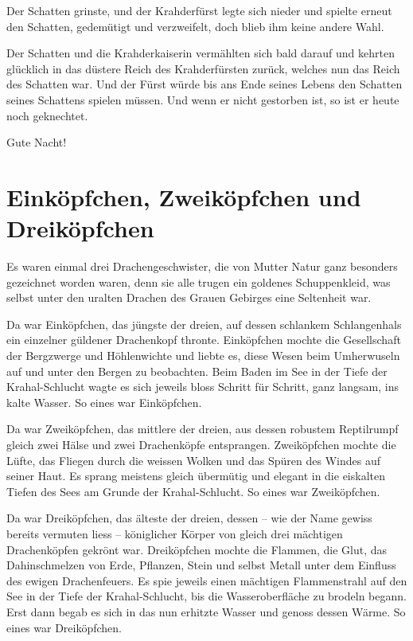 \documentclass[10pt, a4paper, oneside]{book}
\begin{document}
Der Schatten grinste, und der Krahderfürst legte sich nieder und spielte erneut den Schatten, gedemütigt und verzweifelt, doch blieb ihm keine andere Wahl.

Der Schatten und die Krahderkaiserin vermählten sich bald darauf und kehrten glücklich in das düstere Reich des Krahderfürsten zurück, welches nun das Reich des Schatten war. Und der Fürst würde bis ans Ende seines Lebens den Schatten seines Schattens spielen müssen. Und wenn er nicht gestorben ist, so ist er heute noch geknechtet.\bigskip



Gute Nacht!




\newpage
\section{Einköpfchen, Zweiköpfchen und Dreiköpfchen}



Es waren einmal drei Drachengeschwister, die von Mutter Natur ganz besonders gezeichnet worden waren, denn sie alle trugen ein goldenes Schuppenkleid, was selbst unter den uralten Drachen des Grauen Gebirges eine Seltenheit war.



Da war Einköpfchen, das jüngste der dreien, auf dessen schlankem Schlangenhals ein einzelner güldener Drachenkopf thronte. Einköpfchen mochte die Gesellschaft der Bergzwerge und Höhlenwichte und liebte es, diese Wesen beim Umherwuseln auf und unter den Bergen zu beobachten. Beim Baden im See in der Tiefe der Krahal-Schlucht wagte es sich jeweils bloss Schritt für Schritt, ganz langsam, ins kalte Wasser. So eines war Einköpfchen.



Da war Zweiköpfchen, das mittlere der dreien, aus dessen robustem Reptilrumpf gleich zwei Hälse und zwei Drachenköpfe entsprangen. Zweiköpfchen mochte die Lüfte, das Fliegen durch die weissen Wolken und das Spüren des Windes auf seiner Haut. Es sprang meistens gleich übermütig und elegant in die eiskalten Tiefen des Sees am Grunde der Krahal-Schlucht. So eines war Zweiköpfchen.



Da war Dreiköpfchen, das älteste der dreien, dessen – wie der Name gewiss bereits vermuten liess – königlicher Körper von gleich drei mächtigen Drachenköpfen gekrönt war. Dreiköpfchen mochte die Flammen, die Glut, das Dahinschmelzen von Erde, Pflanzen, Stein und selbst Metall unter dem Einfluss des ewigen Drachenfeuers. Es spie jeweils einen mächtigen Flammenstrahl auf den See in der Tiefe der Krahal-Schlucht, bis die Wasseroberfläche zu brodeln begann. Erst dann begab es sich in das nun erhitzte Wasser und genoss dessen Wärme. So eines war Dreiköpfchen.
\end{document}
